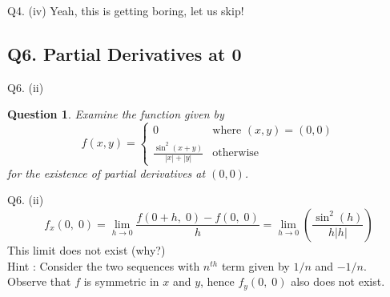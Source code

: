 \documentclass[handout,aspectratio=169]{beamer}
\newtheorem{qsn}{Question}
\begin{document}
\begin{frame}{Q4. (iv)}
 {
    Yeah, this is getting boring, let us skip!
}
\end{frame}

\subsection{Q6. Partial Derivatives at 0}
\begin{frame}{Q6. (ii)}
    \begin{qsn}
        Examine the function given by
         $$f(x,y) = 
         \begin{cases}
         0 & \text{where } (x,y)=(0,0)\\
         \frac{\sin^2(x+y)}{|x|+|y|} & \text{otherwise}
         \end{cases}$$
        for the existence of partial derivatives at $(0, 0)$.
    \end{qsn}
\end{frame}

\begin{frame}{Q6. (ii)}
     {
	    $$f_x(0,\;0) = \displaystyle\lim_{h\to 0}\frac{f(0+h,\;0) - f(0,\;0)}{h} = \displaystyle\lim_{h\to 0}\left(\frac{\sin^2(h)}{h|h|}\right)$$
	}
     {
    This limit does not exist (why?)\\[1mm]
	}
	\uncover<4-> {
	Hint : Consider the two sequences with $n^{th}$ term given by $1/n$ and $-1/n$.\\[1mm] 
	}
     {
    Observe that $f$ is symmetric in $x$ and $y$, hence $f_y(0,\;0)$ also does not exist.
    }
\end{frame}
\end{document}
